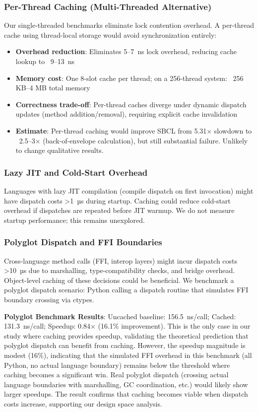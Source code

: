 \documentclass[sigplan,final,acmsmall,review,screen]{acmart}
\begin{document}
\subsubsection{Per-Thread Caching (Multi-Threaded Alternative)}
\label{sec:per-thread-caching}

Our single-threaded benchmarks eliminate lock contention overhead. A per-thread cache using thread-local storage would avoid synchronization entirely:

\begin{itemize}
  \item \textbf{Overhead reduction}: Eliminates 5--7~ns lock overhead, reducing cache lookup to ~9--13~ns
  \item \textbf{Memory cost}: One 8-slot cache per thread; on a 256-thread system: ~256 KB--4 MB total memory
  \item \textbf{Correctness trade-off}: Per-thread caches diverge under dynamic dispatch updates (method addition/removal), requiring explicit cache invalidation
  \item \textbf{Estimate}: Per-thread caching would improve SBCL from 5.31× slowdown to ~2.5--3× (back-of-envelope calculation),
    but still substantial failure. Unlikely to change qualitative results.
\end{itemize}

\subsubsection{Lazy JIT and Cold-Start Overhead}

Languages with lazy JIT compilation (compile dispatch on first invocation) might have dispatch costs >1~µs during startup. Caching could reduce cold-start overhead
if dispatches are repeated before JIT warmup. We do not measure startup performance; this remains unexplored.

\subsubsection{Polyglot Dispatch and FFI Boundaries}

Cross-language method calls (FFI, interop layers) might incur dispatch costs >10~µs due to marshalling, type-compatibility checks, and bridge overhead.
Object-level caching of these decisions could be beneficial. We benchmark a polyglot dispatch scenario: Python calling a dispatch routine that simulates FFI boundary crossing via ctypes.

\textbf{Polyglot Benchmark Results}: Uncached baseline: 156.5~ns/call; Cached: 131.3~ns/call; Speedup: 0.84× (16.1\% improvement).
This is the only case in our study where caching provides speedup, validating the theoretical prediction that polyglot dispatch can benefit from caching.
However, the speedup magnitude is modest (16\%), indicating that the simulated FFI overhead in this benchmark (all Python, no actual language boundary) remains below the threshold where caching
becomes a significant win. Real polyglot dispatch (crossing actual language boundaries with marshalling, GC coordination, etc.) would likely show
larger speedups. The result confirms that caching becomes viable when dispatch costs increase, supporting our design space analysis.
\end{document}

